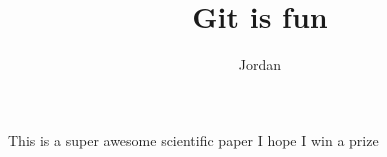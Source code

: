 \documentclass[10pt]{article}
\author{Jordan}
\title{Git is fun}
\begin{document}
	\maketitle

	This is a super awesome scientific paper
	I hope I win a prize
\end{document}
